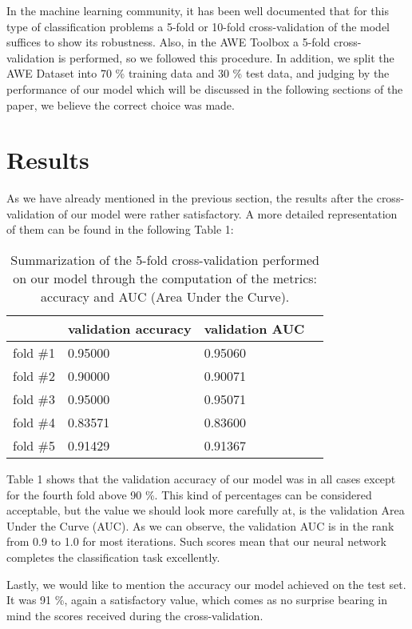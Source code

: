 \documentclass[9pt]{IEEEtran}
\begin{document}
In the machine learning community, it has been well documented that for this type of classification problems a 5-fold or 10-fold cross-validation of the model suffices to show its robustness. Also, in the AWE Toolbox a 5-fold cross-validation is performed, so we followed this procedure. In addition, we split the AWE Dataset into 70 \% training data and 30 \% test data, and judging by the performance of our model which will be discussed in the following sections of the paper, we believe the correct choice was made.

\section{Results}
As we have already mentioned in the previous section, the results after the cross-validation of our model were rather satisfactory. A more detailed representation of them can be found in the following Table 1:

\begin{table}[h!]
\caption{Summarization of the 5-fold cross-validation performed on our model through the computation of the metrics: accuracy and AUC (Area Under the Curve).}
\centering
\begin{tabular}{llll}
\hline
                  & validation accuracy & validation AUC    \\
\hline
fold \#1              & 0.95000   & 0.95060  \\
\hline
fold \#2             & 0.90000     & 0.90071 \\
\hline
fold \#3             & 0.95000   & 0.95071 \\
\hline
fold \#4            & 0.83571  & 0.83600 \\
\hline
fold \#5           & 0.91429   & 0.91367  \\
\hline
\end{tabular}
\end{table}

Table 1 shows that the validation accuracy of our model was in all cases except for the fourth fold above 90 \%. This kind of percentages can be considered acceptable, but the value we should look more carefully at, is the validation Area Under the Curve (AUC). As we can observe, the validation AUC is in the rank from 0.9 to 1.0 for most iterations. Such scores mean that our neural network completes the classification task excellently.

Lastly, we would like to mention the accuracy our model achieved on the test set. It was 91 \%, again a satisfactory value, which comes as no surprise bearing in mind the scores received during the cross-validation.
\end{document}
